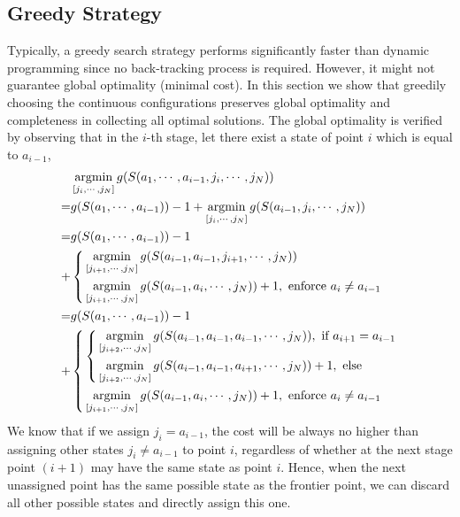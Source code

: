 \documentclass[letterpaper, 10 pt, journal, twoside]{ieeetran}  %
\begin{document}
\subsection{Greedy Strategy}\label{section:greedy}
Typically, a greedy search strategy performs significantly faster than dynamic programming since no back-tracking process is required. 
However, it might not guarantee global optimality (minimal cost). 
In this section we show that greedily choosing the continuous configurations preserves global optimality and completeness in collecting all optimal solutions. 
The global optimality is verified by observing that in the $i$-th stage, let there exist a state of point $i$ which is equal to $a_{i-1}$, 
\begin{equation}\label{equ:optimality}
\begin{aligned}
&\mathop{\rm argmin}\limits_{[j_i, \cdots, j_N]} g(S(a_1, \cdots, a_{i-1}, j_i, \cdots, j_N))\\
=&g(S(a_1, \cdots, a_{i-1})) - 1 + \mathop{\rm argmin}\limits_{[j_i, \cdots, j_N]} g(S(a_{i-1}, j_i, \cdots, j_N))\\
=&g(S(a_1, \cdots, a_{i-1})) - 1 \\
+& \left\{
\begin{aligned}
&\mathop{\rm argmin}\limits_{[j_{i+1}, \cdots, j_N]} g(S(a_{i-1}, a_{i-1}, j_{i+1}, \cdots, j_N))\\
&\mathop{\rm argmin}\limits_{[j_{i+1}, \cdots, j_N]} g(S(a_{i-1}, a_i, \cdots, j_N))+1, \mbox{ enforce }a_i\neq a_{i-1}
\end{aligned}\right.\\
=&g(S(a_1, \cdots, a_{i-1})) - 1 \\
+&\left\{
\begin{aligned}
	&\left\{
	\begin{aligned}
		&\mathop{\rm argmin}\limits_{[j_{i+2}, \cdots, j_N]} g(S(a_{i-1}, a_{i-1}, a_{i-1}, \cdots, j_N)), \mbox{ if } a_{i+1}=a_{i-1}\\
		&\mathop{\rm argmin}\limits_{[j_{i+2}, \cdots, j_N]} g(S(a_{i-1}, a_{i-1}, a_{i+1}, \cdots, j_N))+1, \mbox{ else }
	\end{aligned}
	\right.\\
	&\mathop{\rm argmin}\limits_{[j_{i+1}, \cdots, j_N]} g(S(a_{i-1}, a_i, \cdots, j_N))+1, \mbox{ enforce }a_i\neq a_{i-1}
\end{aligned}
\right.
\end{aligned}
\end{equation}
We know that if we assign $j_i = a_{i-1}$, the cost will be always no higher than assigning other states $j_i\neq a_{i-1}$ to point $i$, 
regardless of whether at the next stage point $(i+1)$ may have the same state as point $i$. 
Hence, when the next unassigned point has the same possible state as the frontier point, we can discard all other possible states and directly assign this one. 
\end{document}

